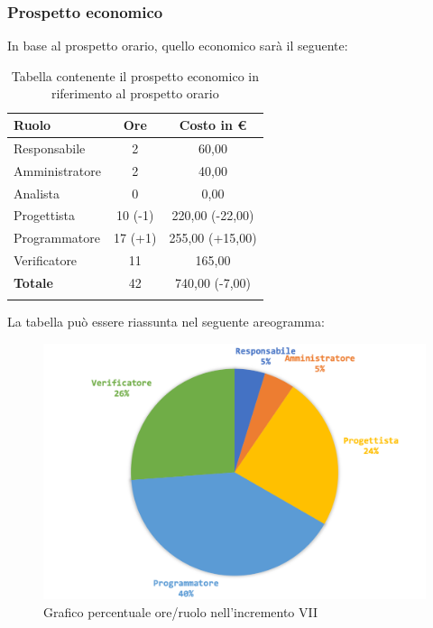 		\subsubsection{Prospetto economico}
		In base al prospetto orario, quello economico sarà il seguente: 
		
		\begin{longtable}{|l|c|c|}
			\hline
			\rowcolor{lighter-grayer}
			\textbf{Ruolo} & \textbf{Ore} & \textbf{Costo in € } \\
			\hline
			\endfirsthead
			
			\hline
			Responsabile 	    & 2 & 60,00\\
			\hline 
			\hline
			Amministratore	   & 2 & 40,00\\
			\hline
			\hline
			Analista 				 & 0 & 0,00\\
			\hline
			\hline
			Progettista 		   & 10 (-1) & 220,00 (-22,00)\\
			\hline
			\hline
			Programmatore 	  & 17 (+1) & 255,00 (+15,00)\\
			\hline
			\hline
			Verificatore 		   & 11 & 165,00\\
			\hline
			\textbf{Totale} 	 & 42 & 740,00 (-7,00)\\
			\hline
			\caption{Tabella contenente il prospetto economico in riferimento al prospetto orario}
		\end{longtable}
		
		La tabella può essere riassunta nel seguente areogramma:
		\begin{figure}[H]
			\centering
			\includegraphics[width=0.8\linewidth]{images/consuntivo/ConsIncr7-2.png}
			\caption{Grafico percentuale ore/ruolo nell'incremento VII}
			\label{fig:consuntivo grafico costi ruolo incremento VII}
		\end{figure}
		\pagebreak
		
